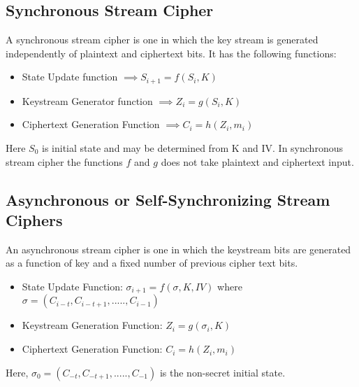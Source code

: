 \documentclass[11pt]{article}
\begin{document}
\subsection{Synchronous Stream Cipher}
A synchronous stream cipher is one in which the key stream is generated independently of plaintext and ciphertext bits. It has the following functions:
\begin{itemize}
    \item State Update function $\implies S_{i+1} = f(S_i, K)$\\
    \item Keystream Generator function $\implies Z_i = g(S_i, K)$\\
    \item Ciphertext Generation Function $\implies C_i = h(Z_i, m_i)$
\end{itemize}
Here $S_0$ is initial state and may be determined from K and IV. In synchronous stream cipher the functions $f$ and $g$ does not take plaintext and ciphertext input.

\subsection{Asynchronous or Self-Synchronizing Stream Ciphers}
An asynchronous stream cipher is one in which the keystream bits are generated as a function of key and a fixed number of previous cipher text bits.
\begin{itemize}
    \item State Update Function: $\sigma_{i+1} = f(\sigma, K, IV)$ where $\sigma = (C_{i-t}, C_{i - t + 1},....., C_{i-1})$\\
    \item Keystream Generation Function: $Z_i = g(\sigma_{i}, K)$\\
    \item Ciphertext Generation Function: $C_i = h(Z_i, m_i)$
\end{itemize}
Here, $\sigma_0 = (C_{-t}, C_{-t + 1},....., C_{-1})$ is the non-secret initial state.
\end{document}
